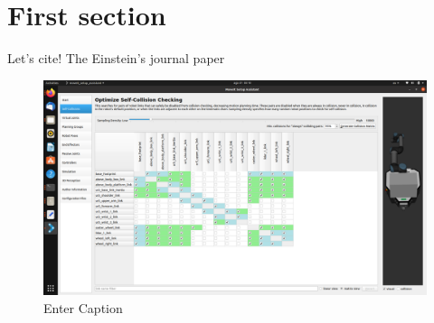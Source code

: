

\def\bibfont{\hfuzz=2pt}




%


\section{First section}


Let's cite! The Einstein's journal paper \cite{Student08}

\medskip

\begin{figure}
    \centering
    \includegraphics[width=0.5\linewidth]{SelfCollisionsMatrix.png}
    \caption{Enter Caption}
    \label{fig:enter-label}
\end{figure}

\printbibliography


%
%
